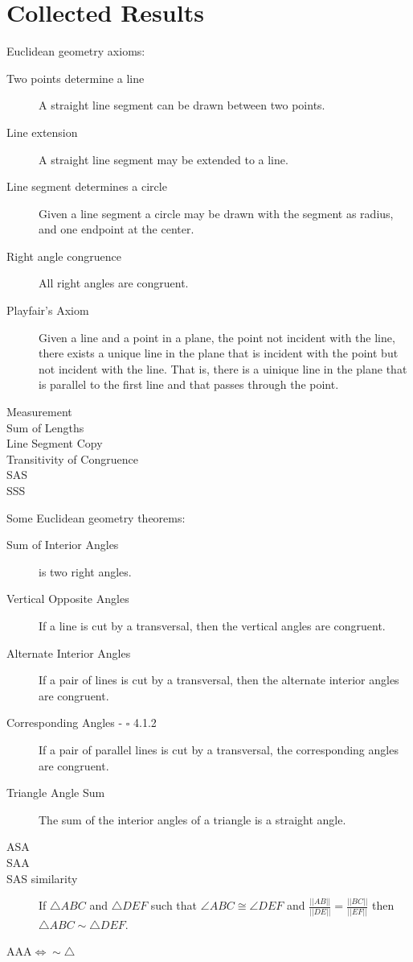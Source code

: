 \documentclass[12pt]{amsart}
\theoremstyle{remark}
\newtheorem*{basic notion}{Basic Notion}
\theoremstyle{mycomment}
\begin{document}
\section{Collected Results}
Euclidean geometry axioms:
\begin{description}
\item[Two points determine a line] A straight line segment can be drawn between two points.
\item[Line extension] A straight line segment may be extended to a line.
\item[Line segment determines a circle] Given a line segment a circle may be drawn with the segment as radius, and one endpoint at the center.
\item[Right angle congruence] All right angles are congruent.
\item[Playfair's Axiom] Given a line and a point in a plane, the point not incident with the line, there exists a unique line in the plane that is incident with the point but not incident with the line. That is, there is a uinique line in the plane that is parallel to the first line and that passes through the point.
\item[Measurement] 
\item[Sum of Lengths]
\item[Line Segment Copy]
\item[Transitivity of Congruence]
\item[SAS]
\item[SSS]
\end{description}
Some Euclidean geometry theorems:
\begin{description}
\item[Sum of Interior Angles] is two right angles.
\item[Vertical Opposite Angles] If a line is cut by a transversal, then the vertical angles are congruent.
\item[Alternate Interior Angles] If a pair of lines is cut by a transversal, then the alternate interior angles are congruent.
\item[Corresponding Angles - $\square$ 4.1.2] If a pair of parallel lines is cut by a transversal, the corresponding angles are congruent.
\item[Triangle Angle Sum] The sum of the interior angles of a triangle is a straight angle.
\item[ASA]
\item[SAA]
\item[SAS similarity] If $\triangle ABC$ and $\triangle DEF$ such that $\angle ABC\cong\angle DEF$ and $\frac{||AB||}{||DE||}=\frac{||BC||}{||EF||}$ then $\triangle ABC\sim\triangle DEF$.
\item[AAA$\iff\sim\triangle$]
\end{description}
\end{document}
